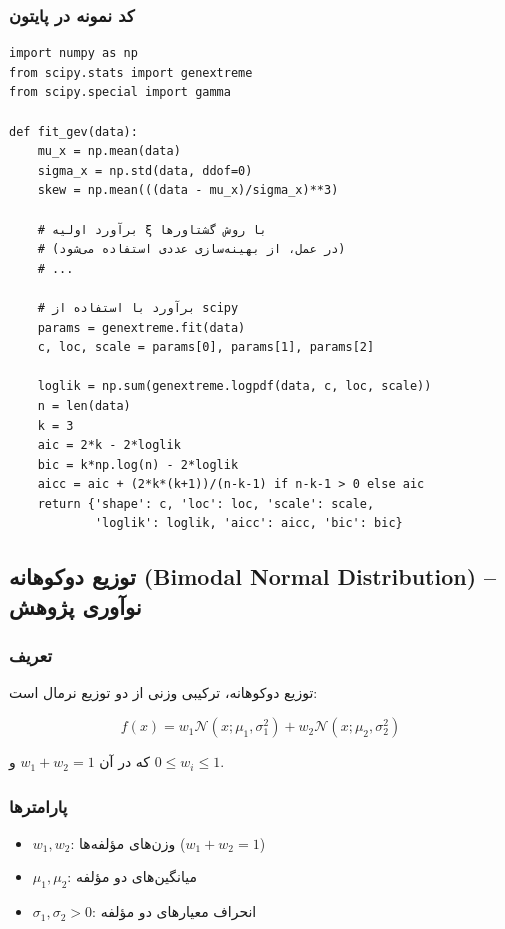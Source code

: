 \documentclass[a4paper,12pt]{article}
\begin{document}
\subsubsection{کد نمونه در پایتون}

\begin{verbatim}
import numpy as np
from scipy.stats import genextreme
from scipy.special import gamma

def fit_gev(data):
    mu_x = np.mean(data)
    sigma_x = np.std(data, ddof=0)
    skew = np.mean(((data - mu_x)/sigma_x)**3)
    
    # برآورد اولیه ξ با روش گشتاورها
    # (در عمل، از بهینه‌سازی عددی استفاده می‌شود)
    # ...
    
    # برآورد با استفاده از scipy
    params = genextreme.fit(data)
    c, loc, scale = params[0], params[1], params[2]
    
    loglik = np.sum(genextreme.logpdf(data, c, loc, scale))
    n = len(data)
    k = 3
    aic = 2*k - 2*loglik
    bic = k*np.log(n) - 2*loglik
    aicc = aic + (2*k*(k+1))/(n-k-1) if n-k-1 > 0 else aic
    return {'shape': c, 'loc': loc, 'scale': scale, 
            'loglik': loglik, 'aicc': aicc, 'bic': bic}
\end{verbatim}

\subsection{توزیع دوکوهانه (Bimodal Normal Distribution) – نوآوری پژوهش}

\subsubsection{تعریف}

توزیع دوکوهانه، ترکیبی وزنی از دو توزیع نرمال است:

\begin{equation}
f(x) = w_1 \mathcal{N}(x; \mu_1, \sigma_1^2) + w_2 \mathcal{N}(x; \mu_2, \sigma_2^2)
\end{equation}

که در آن $w_1 + w_2 = 1$ و $0 \leq w_i \leq 1$.

\subsubsection{پارامترها}

\begin{itemize}
\item $w_1, w_2$: وزن‌های مؤلفه‌ها ($w_1 + w_2 = 1$)
\item $\mu_1, \mu_2$: میانگین‌های دو مؤلفه
\item $\sigma_1, \sigma_2 > 0$: انحراف معیارهای دو مؤلفه
\end{itemize}
\end{document}
